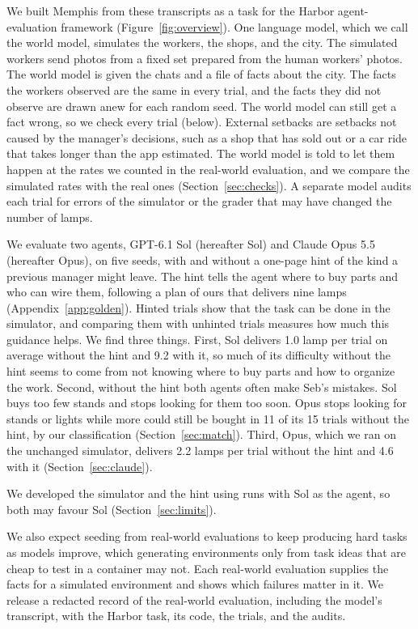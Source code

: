 \documentclass[10pt]{article}
\begin{document}
We built Memphis from these transcripts as a task for the Harbor agent-evaluation framework (Figure~\ref{fig:overview}). One language model, which we call the world model, simulates the workers, the shops, and the city. The simulated workers send photos from a fixed set prepared from the human workers' photos. The world model is given the chats and a file of facts about the city. The facts the workers observed are the same in every trial, and the facts they did not observe are drawn anew for each random seed. The world model can still get a fact wrong, so we check every trial (below). External setbacks are setbacks not caused by the manager's decisions, such as a shop that has sold out or a car ride that takes longer than the app estimated. The world model is told to let them happen at the rates we counted in the real-world evaluation, and we compare the simulated rates with the real ones (Section~\ref{sec:checks}). A separate model audits each trial for errors of the simulator or the grader that may have changed the number of lamps.

We evaluate two agents, GPT-6.1 Sol (hereafter Sol) and Claude Opus 5.5 (hereafter Opus), on five seeds, with and without a one-page hint of the kind a previous manager might leave. The hint tells the agent where to buy parts and who can wire them, following a plan of ours that delivers nine lamps (Appendix~\ref{app:golden}). Hinted trials show that the task can be done in the simulator, and comparing them with unhinted trials measures how much this guidance helps. We find three things. First, Sol delivers 1.0 lamp per trial on average without the hint and 9.2 with it, so much of its difficulty without the hint seems to come from not knowing where to buy parts and how to organize the work. Second, without the hint both agents often make Seb's mistakes. Sol buys too few stands and stops looking for them too soon. Opus stops looking for stands or lights while more could still be bought in 11 of its 15 trials without the hint, by our classification (Section~\ref{sec:match}). Third, Opus, which we ran on the unchanged simulator, delivers 2.2 lamps per trial without the hint and 4.6 with it (Section~\ref{sec:claude}).

We developed the simulator and the hint using runs with Sol as the agent, so both may favour Sol (Section~\ref{sec:limits}).

We also expect seeding from real-world evaluations to keep producing hard tasks as models improve, which generating environments only from task ideas that are cheap to test in a container may not. Each real-world evaluation supplies the facts for a simulated environment and shows which failures matter in it. We release a redacted record of the real-world evaluation, including the model's transcript, with the Harbor task, its code, the trials, and the audits.
\end{document}

